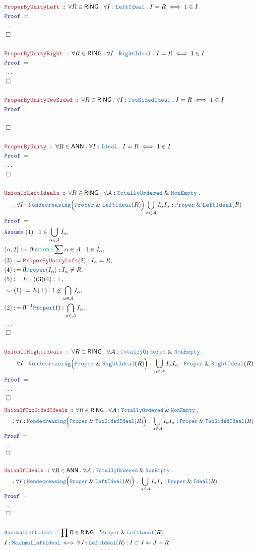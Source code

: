 \documentclass[12pt]{scrartcl}
\newcommand{\TYPE}[1]{\textcolor{NavyBlue}{\mathtt{#1}}}
\newcommand{\FUNC}[1]{\textcolor{Cerulean}{\mathtt{#1}}}
\newcommand{\LOGIC}[1]{\textcolor{Blue}{\mathtt{#1}}}
\newcommand{\THM}[1]{\textcolor{Maroon}{\mathtt{#1}}}
\renewcommand{\.}{\; . \;}
\newcommand{\de}{: \kern 0.1pc =}
\newcommand{\Theorem}[2]{& \THM{#1} \, :: \, #2 \\ & \Proof = \\ }
\newcommand{\DeclareType}[2]{& \TYPE{#1} \, :: \, #2 \\}
\newcommand{\DefineType}[3]{& #1 : \TYPE{#2} \iff #3 \\}
\newcommand{\NewLine}{\\ & \kern 1pc}
\newcommand{\Page}[1]{ \begin{align*} #1 \end{align*}   }
\newcommand{ \bd }{ \ByDef }
\newcommand{\NoProof}{ & \ldots \\ \EndProof}
\renewcommand{\And}{\; \& \;}
\newcommand{\Say}[3]{& #1 \de #2 : #3, \\}
\newcommand{\Derive}[3]{& \leadsto #1 \de #2 : #3, \\}
\newcommand{\Assume}[2]{& \LOGIC{Assume} \; #1 : #2, \\}
\newcommand{\QED}{\; \square}
\newcommand{\EndProof}{& \QED \\}
\newcommand{\ByDef}{\eth}
\newcommand{\Proof}{\LOGIC{Proof} \; }
\newcommand{\A}{\mathcal{A}}
\newcommand{\RING}{\mathsf{RING}}
\newcommand{\ANN}{\mathsf{ANN}}
\begin{document}
\Page{
	\Theorem{ProperByUnityLeft}{\forall R \in \RING \. \forall I : \TYPE{LeftIdeal} \. I = R \iff 1 \in I }
	\NoProof
	\\
	\Theorem{ProperByUnityRight}{\forall R \in \RING \. \forall I : \TYPE{RightIdeal} \. I = R \iff 1 \in I }
	\NoProof
	\\
	\Theorem{ProperByUnityTwoSided}{\forall R \in \RING \. \forall I : \TYPE{TwoSidedIdeal} \. I = R \iff 1 \in I }
	\NoProof
        \\
	\Theorem{ProperByUnity}{\forall R \in \ANN \. \forall I : \TYPE{Ideal} \. I = R \iff 1 \in I }
	\NoProof
	\\
	\Theorem{UnionOfLeftIdeals}{ \forall R \in \RING \. \forall \A : \TYPE{TotallyOrdered} \And \TYPE{NonEmpty} \.  \NewLine \. \forall I : \TYPE{Nondecreasing}\Big( \TYPE{Proper} \And \TYPE{LeftIdeal}(R) \Big)     
		 \bigcup_{\alpha \in \A} I_{\alpha} I_\alpha : \TYPE{Proper} \And \TYPE{LeftIdeal}(R)}
	\Assume{(1)}{1 \in\bigcup_{\alpha \in \A} I_\alpha}
	\Say{(\alpha,2)}{\bd \FUNC{union}}{ \sum \alpha \in A \. 1 \in I_{\alpha} }
	\Say{(3)}{\THM{ProperByUnityLeft}(2)}{ I_\alpha =  R}
	\Say{(4)}{\bd \TYPE{Proper}(I_\alpha)}{ I_\alpha \neq R     }
	\Say{(5)}{ I (\bot)(3)(4)}{ \bot    }
	\Derive{(1)}{  E(\bot)   }{1 \not \in \bigcap_{\alpha \in \A} I_\alpha}
	\Say{(2)}{\bd^{-1} \TYPE{Proper}(1)}{\bigcap_{\alpha \in \A} I_\alpha}
	\NoProof
	\\
	\Theorem{UnionOfRightIdeals}{ \forall R \in \RING \. \forall \A : \TYPE{TotallyOrdered} \And \TYPE{NonEmpty} \. \NewLine \. \forall I : \TYPE{Nondecreasing}\Big( \TYPE{Proper} \And \TYPE{RightIdeal}(R) \Big)  \.   
		 \bigcup_{\alpha \in \A} I_{\alpha} I_\alpha : \TYPE{Proper} \And \TYPE{RightIdeal}(R)}
	\NoProof
}\Page{
	\Theorem{UnionOfTwoSidedIdeals}{ \forall R \in \RING \. \forall \A : \TYPE{TotallyOrdered} \And \TYPE{NonEmpty} \. 
		\NewLine \.\forall I : \TYPE{Nondecreasing}\Big( \TYPE{Proper} \And \TYPE{TwoSidedIdeal}(R) \Big)  \.    \bigcup_{\alpha \in \A} I_{\alpha} I_\alpha : \TYPE{Proper} \And \TYPE{TwoSidedIdeal}(R)}
	\NoProof
	\\
	\Theorem{UnionOfIdeals}{ \forall R \in \ANN \. \forall \A : \TYPE{TotallyOrdered} \And \TYPE{NonEmpty} \. 
		\NewLine \. \forall I : \TYPE{Nondecreasing}\Big( \TYPE{Proper} \And \TYPE{LeftIdeal}(R) \Big)  \.   \bigcup_{\alpha \in \A} I_{\alpha} I_\alpha : \TYPE{Proper} \And \TYPE{Ideal}(R) }	
	\NoProof
	\\
	\DeclareType{MaximalLeftIdeal}{\prod  R \in \RING \.  ?\TYPE{Proper} \And \TYPE{LeftIdeal}(R) }
	\DefineType{I}{MaximalLeftIdeal}{ \forall J : \TYPE{LeftIdeal}(R) \.  I \subset J \Leftarrow J = R }
}
\end{document}
